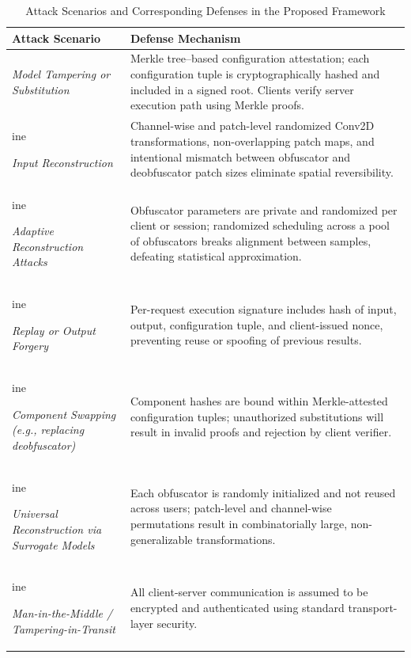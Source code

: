 \documentclass{ieeeaccess}
\begin{document}
\begin{table}[t]
\centering
\caption{Attack Scenarios and Corresponding Defenses in the Proposed Framework}
\label{tab:threat-defense}
\begin{tabular}{p{} p{}}
\toprule

\textbf{Attack Scenario} & \textbf{Defense Mechanism} \\

\midrule

\textit{Model Tampering or Substitution} &
Merkle tree–based configuration attestation; each configuration tuple is cryptographically hashed and included in a signed root. Clients verify server execution path using Merkle proofs. \\

ine

\textit{Input Reconstruction} &
Channel-wise and patch-level randomized Conv2D transformations, non-overlapping patch maps, and intentional mismatch between obfuscator and deobfuscator patch sizes eliminate spatial reversibility. \\

ine

\textit{Adaptive Reconstruction Attacks} &
Obfuscator parameters are private and randomized per client or session; randomized scheduling across a pool of obfuscators breaks alignment between samples, defeating statistical approximation. \\

ine

\textit{Replay or Output Forgery} &
Per-request execution signature includes hash of input, output, configuration tuple, and client-issued nonce, preventing reuse or spoofing of previous results. \\

ine

\textit{Component Swapping (e.g., replacing deobfuscator)} &
Component hashes are bound within Merkle-attested configuration tuples; unauthorized substitutions will result in invalid proofs and rejection by client verifier. \\

ine

\textit{Universal Reconstruction via Surrogate Models} &
Each obfuscator is randomly initialized and not reused across users; patch-level and channel-wise permutations result in combinatorially large, non-generalizable transformations. \\

ine

\textit{Man-in-the-Middle / Tampering-in-Transit} &
All client-server communication is assumed to be encrypted and authenticated using standard transport-layer security. \\

\bottomrule
\end{tabular}
\end{table}
\end{document}

